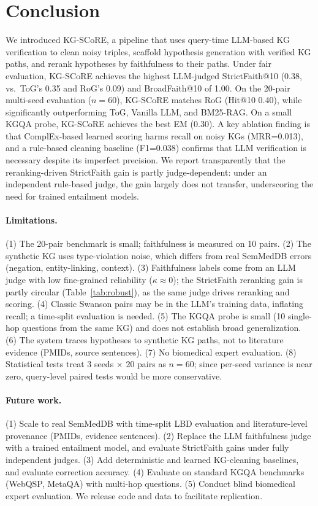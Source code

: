 \section{Conclusion}
\label{sec:conclusion}

We introduced KG-SCoRE, a pipeline that uses query-time LLM-based KG verification to clean noisy triples, scaffold hypothesis generation with verified KG paths, and rerank hypotheses by faithfulness to their paths. Under fair evaluation, KG-SCoRE achieves the highest LLM-judged StrictFaith@10 (0.38, vs.\ ToG's 0.35 and RoG's 0.09) and BroadFaith@10 of 1.00. On the 20-pair multi-seed evaluation ($n{=}60$), KG-SCoRE matches RoG (Hit@10 0.40), while significantly outperforming ToG, Vanilla LLM, and BM25-RAG. On a small KGQA probe, KG-SCoRE achieves the best EM (0.30). A key ablation finding is that ComplEx-based learned scoring harms recall on noisy KGs (MRR=0.013), and a rule-based cleaning baseline (F1=0.038) confirms that LLM verification is necessary despite its imperfect precision. We report transparently that the reranking-driven StrictFaith gain is partly judge-dependent: under an independent rule-based judge, the gain largely does not transfer, underscoring the need for trained entailment models.

\paragraph{Limitations.}
(1) The 20-pair benchmark is small; faithfulness is measured on 10 pairs. (2) The synthetic KG uses type-violation noise, which differs from real SemMedDB errors (negation, entity-linking, context). (3) Faithfulness labels come from an LLM judge with low fine-grained reliability ($\kappa{\approx}0$); the StrictFaith reranking gain is partly circular (Table~\ref{tab:robust}), as the same judge drives reranking and scoring. (4) Classic Swanson pairs may be in the LLM's training data, inflating recall; a time-split evaluation is needed. (5) The KGQA probe is small (10 single-hop questions from the same KG) and does not establish broad generalization. (6) The system traces hypotheses to synthetic KG paths, not to literature evidence (PMIDs, source sentences). (7) No biomedical expert evaluation. (8) Statistical tests treat 3 seeds $\times$ 20 pairs as $n{=}60$; since per-seed variance is near zero, query-level paired tests would be more conservative.

\paragraph{Future work.}
(1) Scale to real SemMedDB with time-split LBD evaluation and literature-level provenance (PMIDs, evidence sentences). (2) Replace the LLM faithfulness judge with a trained entailment model, and evaluate StrictFaith gains under fully independent judges. (3) Add deterministic and learned KG-cleaning baselines, and evaluate correction accuracy. (4) Evaluate on standard KGQA benchmarks (WebQSP, MetaQA) with multi-hop questions. (5) Conduct blind biomedical expert evaluation. We release code and data to facilitate replication.

